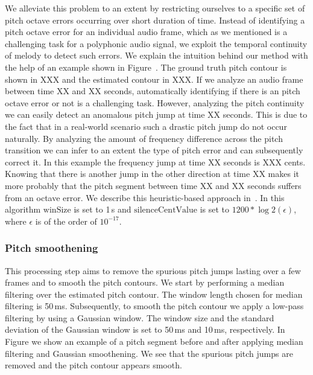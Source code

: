 {\begin{algorithm}
\begin{algorithmic}
		\EndFor
		
	\end{algorithmic}
\end{algorithm}


We alleviate this problem to an extent by restricting ourselves to a specific set of pitch octave errors occurring over short duration of time. Instead of identifying a pitch octave error for an individual audio frame, which as we mentioned is a challenging task for a polyphonic audio signal, we exploit the temporal continuity of melody to detect such errors. We explain the intuition behind our method with the help of an example shown in Figure~. The ground truth pitch contour is shown in XXX and the estimated contour in XXX. If we analyze an audio frame between time XX and XX seconds, automatically identifying if there is an pitch octave error or not is a challenging task. However, analyzing the pitch continuity we can easily detect an anomalous pitch jump at time XX seconds. This is due to the fact that in a real-world scenario such a drastic pitch jump do not occur naturally. By analyzing the amount of frequency difference across the pitch transition we can infer to an extent the type of pitch error and can subsequently correct it. In this example the frequency jump at time XX seconds is XXX cents. Knowing that there is another jump in the other direction at time XX makes it more probably that the pitch segment between time XX and XX seconds suffers from an octave error. We describe this heuristic-based approach in~. In this algorithm $\mathrm{winSize}$ is set to 1\,s and $\mathrm{silenceCentValue}$ is set to $1200*\log2(\epsilon)$, where $\epsilon$ is of the order of $10^{-17}$.


\subsubsection{Pitch smoothening}
\label{sec:data_processing_pitch_smoothening}

This processing step aims to remove the spurious pitch jumps lasting over a few frames and to smooth the pitch contours. We start by performing a median filtering over the estimated pitch contour. The window length chosen for median filtering is 50\,ms. Subsequently, to smooth the pitch contour we apply a low-pass filtering by using a Gaussian window. The window size and the standard deviation of the Gaussian window is set to 50\,ms and 10\,ms, respectively. In Figure  we show an example of a pitch segment before and after applying median filtering and Gaussian smoothening. We see that the spurious pitch jumps are removed and the pitch contour appears smooth.


}

